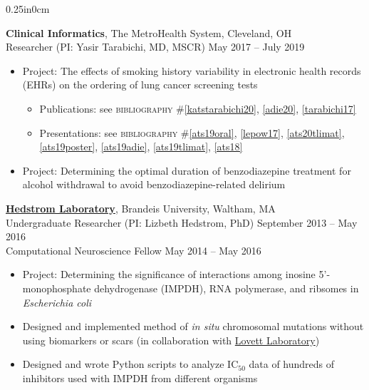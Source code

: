 \documentclass[11pt]{article}
\newcommand{\blockindent}{0.25in}
\newcommand{\job}[4]{
\textbf{#1}, {#2} \\
{#3} \hfill {#4}\\
}
\newcommand{\jobtitle}[2]{
{#1} \hfill {#2}\\
}
\begin{document}
\begin{adjustwidth}{\blockindent}{0cm}
\begin{itemize}
\end{itemize}

\job{Clinical Informatics}{The MetroHealth System, Cleveland, OH}{Researcher (PI: Yasir Tarabichi, MD, MSCR)}{May 2017 -- July 2019}
\begin{itemize}

	\item Project: The effects of smoking history variability in electronic health records (EHRs) on the ordering of lung cancer screening tests
	\begin{itemize}
		\vspace{-3pt}
		\item Publications: see \textsc{bibliography} \#\ref{katstarabichi20}, \ref{adie20}, \ref{tarabichi17}
		\item Presentations: see \textsc{bibliography} \#\ref{ats19oral}, \ref{lepow17}, \ref{ats20tlimat}, \ref{ats19poster}, \ref{ats19adie}, \ref{ats19tlimat}, \ref{ats18}
	\end{itemize}

	\item Project: Determining the optimal duration of benzodiazepine treatment for alcohol withdrawal to avoid benzodiazepine-related delirium

\end{itemize}

\job{\href{http://www.bio.brandeis.edu/hedstromlab/Site/Home.html}{Hedstrom Laboratory}}{Brandeis University, Waltham, MA}{Undergraduate Researcher (PI: Lizbeth Hedstrom, PhD)}{September 2013 -- May 2016}
\jobtitle{Computational Neuroscience Fellow}{May 2014 -- May 2016}
\begin{itemize}

	\item Project: Determining the significance of interactions among inosine 5'-monophosphate dehydrogenase (IMPDH), RNA polymerase, and ribsomes in \textit{Escherichia coli}

	\vspace{3pt}
	\item Designed and implemented method of \textit{in situ} chromosomal mutations without using biomarkers or scars (in collaboration with \href{http://www.bio.brandeis.edu/lovettlab/lovettlabhomepage.html}{Lovett Laboratory})

	\item Designed and wrote Python scripts to analyze IC$_{50}$ data of hundreds of inhibitors used with IMPDH from different organisms
	\begin{itemize}


\end{itemize}
\end{itemize}
\end{adjustwidth}
\end{document}
